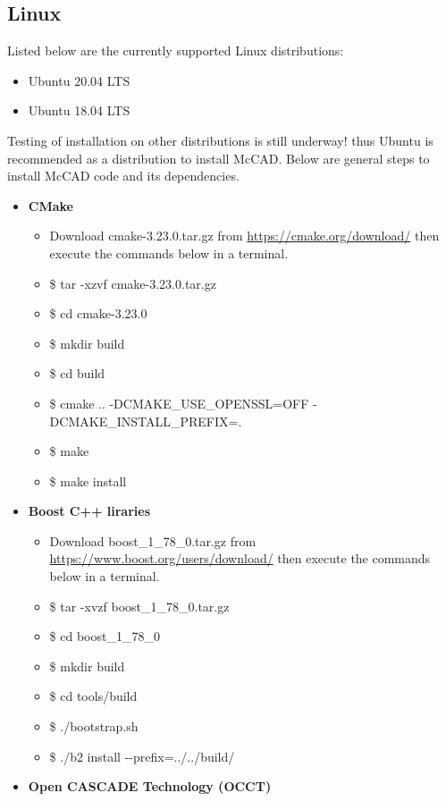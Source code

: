 \documentclass[letterpaper, 12 pt]{report}
\begin{document}
  \subsection{Linux}
    Listed below are the currently supported Linux distributions:
    \begin{itemize}
  	  \item Ubuntu 20.04 LTS
  	  \item Ubuntu 18.04 LTS
    \end{itemize} 
    Testing of installation on other distributions is still underway! thus Ubuntu is recommended as a distribution to install McCAD. Below are general steps to install McCAD code and its dependencies.
    \begin{itemize}
  	  \item \textbf{CMake}
  	  \begin{itemize}
		\item Download cmake-3.23.0.tar.gz from \url{https://cmake.org/download/} then execute the commands below in a terminal.
		\item \$ tar -xzvf cmake-3.23.0.tar.gz
		\item \$ cd cmake-3.23.0
		\item \$ mkdir build
		\item \$ cd build
		\item \$ cmake .. -DCMAKE\_USE\_OPENSSL=OFF -DCMAKE\_INSTALL\_PREFIX=.
		\item \$ make
		\item \$ make install
  	  \end{itemize}
      \item \textbf{Boost C++ liraries}
      \begin{itemize}
    	\item Download boost\_1\_78\_0.tar.gz from \url{https://www.boost.org/users/download/} then execute the commands below in a terminal.
    	\item \$ tar -xvzf boost\_1\_78\_0.tar.gz
    	\item \$ cd boost\_1\_78\_0
    	\item \$ mkdir build
    	\item \$ cd tools/build
    	\item \$ ./bootstrap.sh
    	\item \$ ./b2 install -\--prefix=../../build/
      \end{itemize}
      \item \textbf{Open CASCADE Technology (OCCT)}
      \begin{itemize}

\end{itemize}
\end{itemize}
\end{document}

